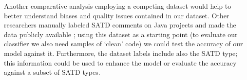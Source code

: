 Another comparative analysis employing a competing dataset would help to better understand biases and quality issues contained in our dataset. Other researchers manually labeled SATD comments on Java projects and made the data publicly available \cite{maldonado2015detecting}; using this dataset as a starting point (to evaluate our classifier we also need samples of `clean' code) we could test the accuracy of our model against it. Furthermore, the dataset labels include also the SATD type; this information could be used to enhance the model or evaluate the accuracy against a subset of SATD types.







